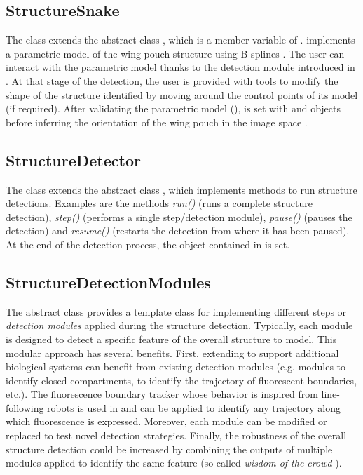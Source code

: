 \subsection{StructureSnake}
The class \WPouchStructureSnake extends the abstract class \StructureSnake, which is a member variable of \Structure. \WPouchStructureSnake implements a parametric model of the wing pouch structure using B-splines \autocite{DelgadoGonzalo2012}. The user can interact with the parametric model thanks to the detection module \InteractiveStructure introduced in . At that stage of the detection, the user is provided with tools to modify the shape of the structure identified by moving around the control points of its model (if required). After validating the parametric model (\WPouchStructureSnake), \WPouchStructure is set with \Compartment and \Boundary objects before inferring the orientation of the wing pouch in the image space \autocite{schaffter2013}.

\subsection{StructureDetector}
The class \WPouchStructureDetector extends the abstract class \StructureDetector, which implements methods to run structure detections. Examples are the methods \textit{run()} (runs a complete structure detection), \textit{step()} (performs a single step/detection module), \textit{pause()} (pauses the detection) and \textit{resume()} (restarts the detection from where it has been paused). At the end of the detection process, the \Structure object contained in \StructureDetector is set.

\subsection{StructureDetectionModules}\label{sec:wpouch_modules}
The abstract class \StructureDetectionModule provides a template class for implementing different steps or \emph{detection modules} applied during the structure detection. Typically, each module is designed to detect a specific feature of the overall structure to model. This modular approach has several benefits. First, extending \wingj to support additional biological systems can benefit from existing detection modules (e.g. modules to identify closed compartments, to identify the trajectory of fluorescent boundaries, etc.). The fluorescence boundary tracker whose behavior is inspired from line-following robots is used in \WPouchBoundariesDetection and can be applied to identify any trajectory along which fluorescence is expressed. Moreover, each module can be modified or replaced to test novel detection strategies. Finally, the robustness of the overall structure detection could be increased by combining the outputs of multiple modules applied to identify the same feature (so-called \textit{wisdom of the crowd} \autocite{surowiecki2004wisdom}).\\

